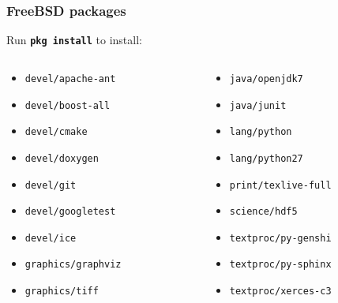 \documentclass{beamer}
\newcommand{\cmd}[1]{\textbf{\texttt{#1}}}
\newcommand{\pkg}[1]{\texttt{#1}}
\begin{document}
\begin{frame}
  \frametitle{FreeBSD packages}
  \scriptsize
  Run \cmd{pkg install} to install:
  \begin{columns}
    \begin{column}{.5\linewidth}
      \begin{itemize}
      \item[] \pkg{devel/apache-ant}
      \item[] \pkg{devel/boost-all}
      \item[] \pkg{devel/cmake}
      \item[] \pkg{devel/doxygen}
      \item[] \pkg{devel/git}
      \item[] \pkg{devel/googletest}
      \item[] \pkg{devel/ice}
      \item[] \pkg{graphics/graphviz}
      \item[] \pkg{graphics/tiff}
      \end{itemize}
      \end{column}
    \begin{column}{.5\linewidth}
    \begin{itemize}
      \item[] \pkg{java/openjdk7}
      \item[] \pkg{java/junit}
      \item[] \pkg{lang/python}
      \item[] \pkg{lang/python27}
      \item[] \pkg{print/texlive-full}
      \item[] \pkg{science/hdf5}
      \item[] \pkg{textproc/py-genshi}
      \item[] \pkg{textproc/py-sphinx}
      \item[] \pkg{textproc/xerces-c3}
    \end{itemize}
    \end{column}
  \end{columns}
\end{frame}
\end{document}
